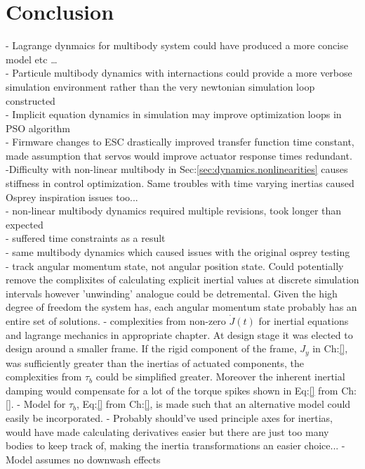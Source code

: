 \chapter{Conclusion}
\label{ch:conclusion}
- Lagrange dynmaics for multibody system could have produced a more concise model etc \ldots\\
- Particule multibody dynamics with internactions could provide a more verbose simulation environment rather than the very newtonian simulation loop constructed\\
- Implicit equation dynamics in simulation may improve optimization loops in PSO algorithm\\
- Firmware changes to ESC drastically improved transfer function time constant, made assumption that servos would improve actuator response times redundant.\\
-Difficulty with non-linear multibody in Sec:\ref{sec:dynamics.nonlinearities} causes stiffness in control optimization. Same troubles with time varying inertias caused Osprey inspiration issues too...\\
- non-linear multibody dynamics required multiple revisions, took longer than expected\\
- suffered time constraints as a result\\
- same multibody dynamics which caused issues with the original osprey testing\cite{}\\
- track angular momentum state, not angular position state. Could potentially remove the complixites of calculating explicit inertial values at discrete simulation intervals however 'unwinding' analogue could be detremental. Given the high degree of freedom the system has, each angular momentum state probably has an entire set of solutions.
- complexities from non-zero $\dot{J}(t)$ for inertial equations and lagrange mechanics in appropriate chapter. At design stage it was elected to design around a smaller frame. If the rigid component of the frame, $J_y$ in Ch:\ref{}, was sufficiently greater than the inertias of actuated components, the complexities from $\tau_b$ could be simplified greater. Moreover the inherent inertial damping would compensate for a lot of the torque spikes shown in Eq:\ref{} from Ch:\ref{}.
- Model for $\tau_b$, Eq:\ref{} from Ch:\ref{}, is made such that an alternative model could easily be incorporated.
- Probably should've used principle axes for inertias, would have made calculating derivatives easier but there are just too many bodies to keep track of, making the inertia transformations an easier choice...
-Model assumes no downwash effects
